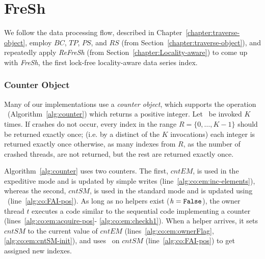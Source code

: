 \chapter{FreSh}
\label{chapter:FreSh}

We follow the data processing flow, described in Chapter~\ref{chapter:traverse-object},
employ $\mathit{BC}$, $\mathit{TP}$, $\mathit{PS}$, and $\mathit{RS}$ (from Section~\ref{chapter:traverse-object}),
and repeatedly apply \textit{ReFreSh} (from Section~\ref{chapter:Locality-aware}) to come up with \textit{FreSh},
the first lock-free locality-aware data series index.

\subsection{Counter Object}



Many of our implementations use a {\em counter object}, which supports the
operation \NextIndex\ (Algorithm~\ref{alg:counter}) which returns a positive integer. 
Let \NextIndex\ be invoked $K$ times.
If crashes do not occur, every index in the range $R = 
\{0, \ldots, K-1\}$ should be returned exactly once; 
(i.e. by a distinct of the $K$ invocations) each integer 
is returned exactly once otherwise, as many indexes from $R$,
as the number of crashed  threads, 
are not returned, but the rest are returned exactly once.

Algorithm~\ref{alg:counter} uses two counters. The first, $\mathit{cntEM}$,
is used in the expeditive mode and is updated by simple writes
(line~\ref{alg:co:em:inc-elements}),
whereas the second, $\mathit{cntSM}$, is used in the standard mode and
is updated using \FAI\ (line~\ref{alg:co:FAI-pos}).
As long as no helpers exist ($\mathit{h = \mbox{\texttt{False}}}$), the owner thread $t$ executes 
a code similar to the sequential code implementing a counter (lines~\ref{alg:co:em:acquire-pos}-
\ref{alg:co:em:checkh1}). When a helper arrives, it sets $\mathit{cntSM}$ to the current
value of $cntEM$ (lines~\ref{alg:co:em:ownerFlag}, \ref{alg:co:em:cntSM-init}),
and uses \FAI\ on $\mathit{cntSM}$ (line~\ref{alg:co:FAI-pos}) to get assigned new indexes. 

